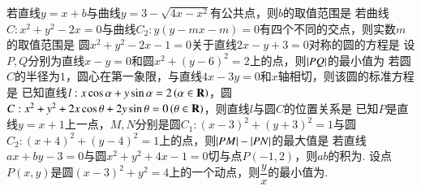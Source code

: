 \documentclass{BHCexam}
\begin{document}
\fubiaoti{}
\maketitle
\begin{questions}
\qs 若直线$y=x+b$与曲线$ y=3-\sqrt{4x-x^2} $有公共点，则$ b $的取值范围是\xx
{}
\qs 若曲线$ C:x^2+y^2-2x=0 $与曲线$ C_2:y(y-mx-m)=0 $有四个不同的交点，则实数$ m $的取值范围是\xx
{}
\qs 圆$ x^2+y^2-2x-1=0 $关于直线$ 2x-y+3=0 $对称的圆的方程是\xx
{}
\qs 设$ P,Q $分别为直线$ x-y=0 $和圆$ x^2+\left(y-6\right)^2 =2$上的点，则$ \left| PQ \right| $的最小值为\xx
{}
\qs 若圆$ C $的半径为$ 1 $，圆心在第一象限，与直线$ 4x-3y=0 $和$ x $轴相切，则该圆的标准方程是\xx
{}
\qs 已知直线$ l:x\cos \alpha+y\sin \alpha=2\left(\alpha\in\mathbf{R}\right)$，圆$ C:x^2+y^2+2x\cos\theta+2y\sin\theta=0\left(\theta\in\mathbf{R}\right) $，则直线$ l $与圆$C  $的位置关系是\xx
{}
\qs 已知$ P $是直线$ y=x+1 $上一点，$ M,N $分别是圆$ C_1:\left(x-3\right)^2+\left(y+3\right)^2=1 $与圆$ C_2:\left(x+4\right)^2+\left(y-4\right)^2=1 $上的点，则$ \left| PM \right|-\left| PN \right| $的最大值是\xx
{}
\qs 若直线$ ax+by-3=0 $与圆$ x^2+y^2+4x-1=0 $切与点$ P\left(-1,2\right) $，则$ ab $的积为\tk.
\qs 设点$ P\left(x,y\right) $是圆$ \left(x-3\right)^2+y^2=4 $上的一个动点，则$ \dfrac{y}{x} $的最小值为\tk. 
\end{questions}
\end{document}
